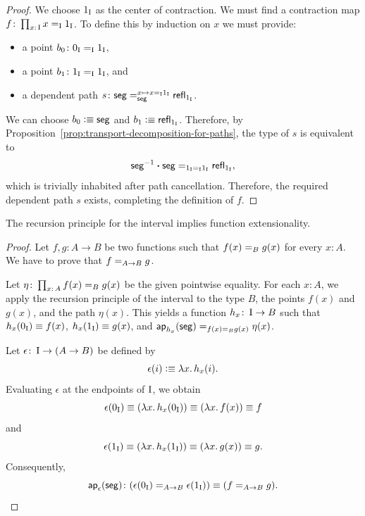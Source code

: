 \begin{proof}
    We choose $1_{\operatorname{I}}$ as the center of contraction. We must find a contraction map $f\colon\prod_{x\colon\op I}x\eq{\op I}1_{\op I}$. To define this by induction on $x$ we must provide:
    \begin{itemize}
        \item a point $b_0\colon 0_{\op I}\eq{\op I} 1_{\op I}$,
        
        \item a point $b_1\colon 1_{\op I}\eq{\op I}1_{\op I}$, and
        
        \item a dependent path $s\colon\fun{seg}\eqt{\fun{seg}}{x\mapsto x\eq{\op I}1_{\op I}}\fun{refl}_{1_{\op I}}$.
    \end{itemize}
    We can choose $b_0\mathrel{\vcentcolon}\equiv\mathsf{seg}$ and $b_1\mathrel{\vcentcolon}\equiv\mathsf{refl}_{1_{\operatorname{I}}}$. Therefore, by Proposition~\ref{prop:transport-decomposition-for-paths}, the type of $s$ is equivalent to
    \[
        \mathsf{seg}^{-1}\mathbin{\boldsymbol{\cdot}}\mathsf{seg}
        \mathrel{=_{1_{\operatorname{I}}\mathrel{=_{\operatorname{I}}}1_{\operatorname{I}}}}
        \mathsf{refl}_{1_{\operatorname{I}}},
    \]
    which is trivially inhabited after path cancellation. Therefore, the required dependent path $s$ exists, completing the definition of $f$.
\end{proof}

\begin{thm} {}
    The recursion principle for the interval implies function extensionality.
\end{thm}

\begin{proof}
    Let $f,g\colon A\to B$ be two functions such that $f(x)\mathrel{=_{B}}g(x)$ for every $x\colon A$. We have to prove that $f\mathrel{=_{A\to B}}g$.
    
    Let $\eta\colon\prod_{x\colon A}f(x)\eq Bg(x)$ be the given pointwise equality. For each $x\colon A$, we apply the recursion principle of the interval to the type $B$, the points $f(x)$ and $g(x)$, and the path $\eta(x)$. This yields a function $h_x\colon\op I\to B$ such that $h_x(0_{\operatorname{I}})\equiv f(x)$, $h_x(1_{\operatorname{I}})\equiv g(x)$, and $\mathsf{ap}_{h_x}(\mathsf{seg})\mathrel{=_{f(x)\mathrel{=_{B}} g(x)}}\eta(x)$.
    
    Let $\epsilon\colon\op I\to(A\to B)$ be defined by
    \[
        \epsilon(i)\mathrel{\vcentcolon}\equiv\lambda x.\,h_x(i).
    \]
    Evaluating $\epsilon$ at the endpoints of $\operatorname{I}$, we obtain
    \[
        \epsilon(0_{\operatorname{I}})
            \equiv(\lambda x.\,h_x(0_{\operatorname{I}}))
            \equiv(\lambda x.\,f(x))
            \equiv f
    \]
    and
    \[
        \epsilon(1_{\operatorname{I}})
            \equiv(\lambda x.\,h_x(1_{\operatorname{I}}))
            \equiv(\lambda x.\,g(x))
            \equiv g.
    \]
    Consequently,
    \[
        \fun{ap}_\epsilon(\fun{seg})\colon
            (
                \epsilon(0_{\op I})
                \eq{A\to B}
                \epsilon(1_{\op I})
            )
            \equiv(f\eq{A\to B}g).
    \]
\end{proof}

